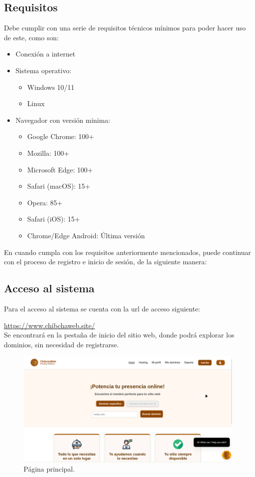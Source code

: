 \subsection{Requisitos}
Debe cumplir con una serie de requisitos técnicos mínimos para poder hacer uso de este, como son:

\begin{itemize}
	\item Conexión a internet

\item Sistema operativo:
    \begin{itemize}
        \item Windows 10/11
        \item Linux
    \end{itemize}

\item Navegador con versión minima:
    \begin{itemize}
    \item Google Chrome: 100+
    \item Mozilla: 100+
    \item Microsoft Edge: 100+
    \item Safari (macOS): 15+
    \item Opera: 85+
    \item Safari (iOS): 15+
    \item Chrome/Edge Android: Última versión
    \end{itemize}
\end{itemize}

En cuando cumpla con los requisitos anteriormente mencionados, puede continuar con el proceso de registro e inicio de sesión, de la siguiente manera:

\subsection{Acceso al sistema}

Para el acceso al sistema se cuenta con la url de acceso siguiente:

\url{ https://www.chibchaweb.site/}\\

Se encontrará en la pestaña de inicio del sitio web, donde podrá explorar los dominios, sin necesidad de registrarse.

\begin{figure}[H]
	\includegraphics[width=\columnwidth]{acceso/inicio.png}
	\caption{Página principal.}
	\label{fig:inicio}
\end{figure}

